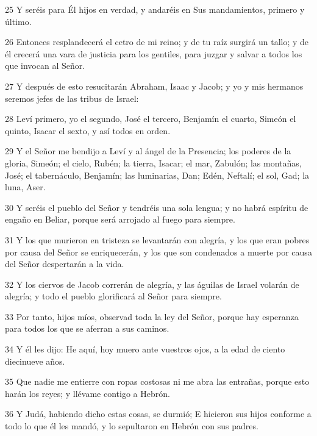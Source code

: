 \par 25 Y seréis para Él hijos en verdad, y andaréis en Sus mandamientos, primero y último.

\par 26 Entonces resplandecerá el cetro de mi reino; y de tu raíz surgirá un tallo; y de él crecerá una vara de justicia para los gentiles, para juzgar y salvar a todos los que invocan al Señor.

\par 27 Y después de esto resucitarán Abraham, Isaac y Jacob; y yo y mis hermanos seremos jefes de las tribus de Israel:

\par 28 Leví primero, yo el segundo, José el tercero, Benjamín el cuarto, Simeón el quinto, Isacar el sexto, y así todos en orden.

\par 29 Y el Señor me bendijo a Leví y al ángel de la Presencia; los poderes de la gloria, Simeón; el cielo, Rubén; la tierra, Isacar; el mar, Zabulón; las montañas, José; el tabernáculo, Benjamín; las luminarias, Dan; Edén, Neftalí; el sol, Gad; la luna, Aser.

\par 30 Y seréis el pueblo del Señor y tendréis una sola lengua; y no habrá espíritu de engaño en Beliar, porque será arrojado al fuego para siempre.

\par 31 Y los que murieron en tristeza se levantarán con alegría, y los que eran pobres por causa del Señor se enriquecerán, y los que son condenados a muerte por causa del Señor despertarán a la vida.

\par 32 Y los ciervos de Jacob correrán de alegría, y las águilas de Israel volarán de alegría; y todo el pueblo glorificará al Señor para siempre.

\par 33 Por tanto, hijos míos, observad toda la ley del Señor, porque hay esperanza para todos los que se aferran a sus caminos.

\par 34 Y él les dijo: He aquí, hoy muero ante vuestros ojos, a la edad de ciento diecinueve años.

\par 35 Que nadie me entierre con ropas costosas ni me abra las entrañas, porque esto harán los reyes; y llévame contigo a Hebrón.

\par 36 Y Judá, habiendo dicho estas cosas, se durmió; E hicieron sus hijos conforme a todo lo que él les mandó, y lo sepultaron en Hebrón con sus padres.


